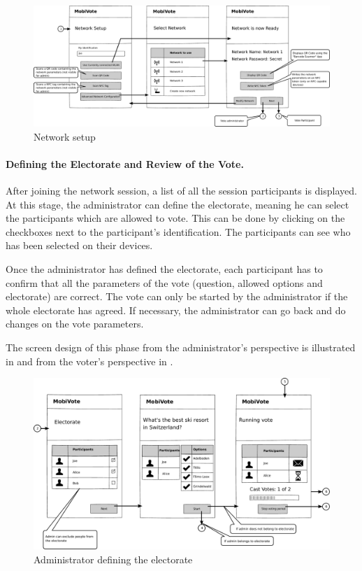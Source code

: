 \documentclass[numbers=noenddot, abstract=on, a4paper, headsepline,
footsepline, oneside, openright, draft=off, listof=leveldown]{scrreprt}
\begin{document}
\begin{figure}[htb]
	\centering
	\includegraphics[height=.3\textheight]{img/storyboard/network_setup}
	\caption{Network setup}
	\label{fig:network_setup}
\end{figure}


\paragraph{Defining the Electorate and Review of the Vote.}
After joining the network session, a list of all the session participants is
displayed. At this stage, the administrator can define the electorate, meaning
he can select the participants which are allowed to vote. This can be done by
clicking on the checkboxes next to the participant's identification. The
participants can see who has been selected on their devices.

Once the administrator has defined the electorate, each participant has to
confirm that all the parameters of the vote (question, allowed options
and electorate) are correct. The vote can only be started by the administrator
if the whole electorate has agreed. If necessary, the administrator can go back and do changes on the vote parameters.

The screen design of this phase from the administrator's perspective is
illustrated in  and from the voter's perspective in
.

\begin{figure}[htb]
	\centering
	\includegraphics[height=.3\textheight]{img/storyboard/admin_review}
	\caption{Administrator defining the electorate}
	\label{fig:admin_review}
\end{figure}
\end{document}
